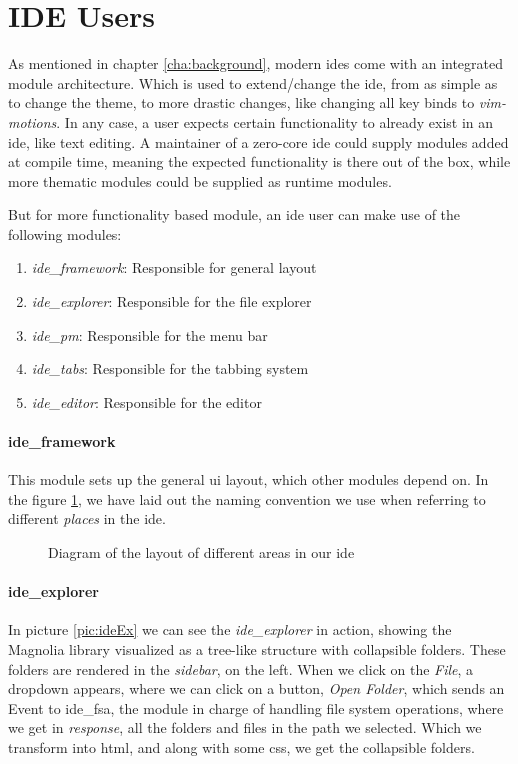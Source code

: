 \section{IDE Users}

As mentioned in chapter \ref{cha:background}, modern \gls*{ide}s come with an
integrated module architecture. Which is used to extend/change the \gls*{ide},
from as simple as to change the theme, to more drastic changes, like changing
all key binds to \textit{vim-motions}. In any case, a user expects certain
functionality to already exist in an \gls*{ide}, like text editing. A maintainer
of a zero-core \gls*{ide} could supply modules added at compile time, meaning the
expected functionality is there out of the box, while more thematic modules
could be supplied as runtime modules.

But for more functionality based module, an \gls*{ide} user can make use of the
following modules:

\begin{enumerate}
  \item \textit{ide\_framework}: Responsible for general layout
  \item \textit{ide\_explorer}: Responsible for the file explorer
  \item \textit{ide\_pm}: Responsible for the menu bar
  \item \textit{ide\_tabs}: Responsible for the tabbing system
  \item \textit{ide\_editor}: Responsible for the editor
\end{enumerate}

\paragraph{ide\_framework} This module sets up the general \gls*{ui} layout,
which other modules depend on. In the figure \ref{fig:ideLayout}, we have laid
out the naming convention we use when referring to different \textit{places} in
the \gls*{ide}.

\begin{figure}[H]
  \centering
  
  \caption{
    Diagram of the layout of different areas in our \gls*{ide}
  }
  \label{fig:ideLayout}
\end{figure}

\paragraph{ide\_explorer} In picture \ref{pic:ideEx} we can see the
\textit{ide\_explorer} in action, showing the Magnolia library visualized as a
tree-like structure with collapsible folders. These folders are rendered in the
\textit{sidebar}, on the left. When we click on the \textit{File}, a dropdown
appears, where we can click on a button, \textit{Open Folder}, which sends an
Event to \gls*{ide}\_fsa, the module in charge of handling file system
operations, where we get in \textit{response}, all the folders and files in the
path we selected. Which we transform into \gls*{html}, and along with some
\gls*{css}, we get the collapsible folders.

